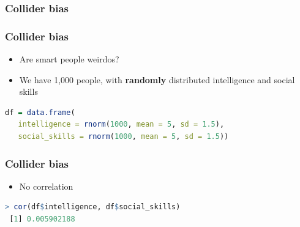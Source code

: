 \documentclass[aspectratio=43]{beamer}
\begin{document}
\begin{frame}
\frametitle{Collider bias}\label{collider}
\centering


\end{frame}


%
%


\begin{frame}[fragile]
\frametitle{Collider bias}
\centering

\begin{itemize}
  \item Are smart people weirdos?
  \item We have 1,000 people, with \textbf{randomly} distributed intelligence and social skills
\end{itemize}

 \begin{lstlisting}[language=R]
 df = data.frame(
   intelligence = rnorm(1000, mean = 5, sd = 1.5),
   social_skills = rnorm(1000, mean = 5, sd = 1.5))
 \end{lstlisting}

\end{frame}

\begin{frame}[fragile]
\frametitle{Collider bias}
\centering

\begin{itemize}
  \item No correlation
\end{itemize}

 \begin{lstlisting}[language=R]
 > cor(df$intelligence, df$social_skills)
 [1] 0.005902188
 \end{lstlisting}

\end{frame}
\end{document}
